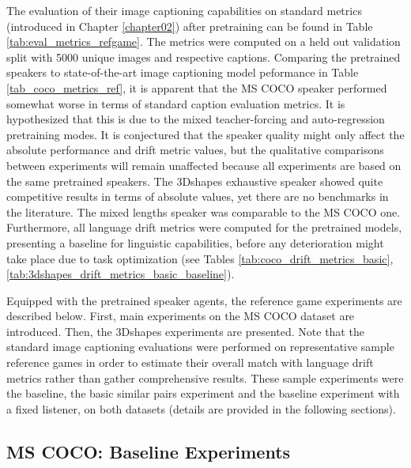 The evaluation of their image captioning capabilities on standard metrics (introduced in Chapter \ref{chapter02}) after pretraining can be found in Table \ref{tab:eval_metrics_refgame}. The metrics were computed on a held out validation split with 5000 unique images and respective captions. Comparing the pretrained speakers to state-of-the-art image captioning model peformance in Table \ref{tab_coco_metrics_ref}, it is apparent that the MS COCO speaker performed somewhat worse in terms of standard caption evaluation metrics. It is hypothesized that this is due to the mixed teacher-forcing and auto-regression pretraining modes. It is conjectured that the speaker quality might only affect the absolute performance and drift metric values, but the qualitative comparisons between experiments will remain unaffected because all experiments are based on the same pretrained speakers. The 3Dshapes exhaustive speaker showed quite competitive results in terms of absolute values, yet there are no benchmarks in the literature. The mixed lengths speaker was comparable to the MS COCO one.
Furthermore, all language drift metrics were computed for the pretrained models, presenting a baseline for linguistic capabilities, before any deterioration might take place due to task optimization (see Tables \ref{tab:coco_drift_metrics_basic}, \ref{tab:3dshapes_drift_metrics_basic_baseline}).

Equipped with the pretrained speaker agents, the reference game experiments are described below. First, main experiments on the MS COCO dataset are introduced. Then, the 3Dshapes experiments are presented. Note that the standard image captioning evaluations were performed on representative sample reference games in order to estimate their overall match with language drift metrics rather than gather comprehensive results. These sample experiments were the baseline, the basic similar pairs experiment and the baseline experiment with a fixed listener, on both datasets (details are provided in the following sections).

\subsection{MS COCO: Baseline Experiments}
\label{expt:coco_baseline}


